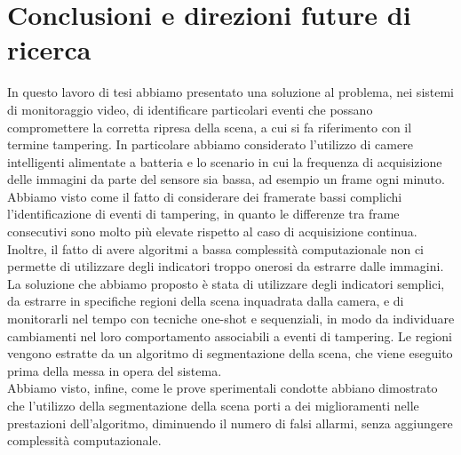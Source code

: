 \chapter{Conclusioni e direzioni future di ricerca}
\label{Conclusioni}
\thispagestyle{empty}

\noindent In questo lavoro di tesi abbiamo presentato una soluzione al problema, nei sistemi di monitoraggio video, di identificare particolari eventi che possano compromettere la corretta ripresa della scena, a cui si fa riferimento con il termine tampering.
In particolare abbiamo considerato l'utilizzo di camere intelligenti alimentate a batteria e lo scenario in cui la frequenza di acquisizione delle immagini da parte del sensore sia bassa, ad esempio un frame ogni minuto.\\
Abbiamo visto come il fatto di considerare dei framerate bassi complichi l'identificazione di eventi di tampering, in quanto le differenze tra frame consecutivi sono molto pi\`u elevate rispetto al caso di acquisizione continua. 
Inoltre, il fatto di avere algoritmi a bassa complessit\`a computazionale non ci permette di utilizzare degli indicatori troppo onerosi da estrarre dalle immagini.\\
La soluzione che abbiamo proposto \`e stata di utilizzare degli indicatori semplici, da estrarre in specifiche regioni della scena inquadrata dalla camera, e di monitorarli nel tempo con tecniche one-shot e sequenziali, in modo da individuare cambiamenti nel loro comportamento associabili a eventi di tampering.
Le regioni vengono estratte da un algoritmo di segmentazione della scena, che viene eseguito prima della messa in opera del sistema.\\
Abbiamo visto, infine, come le prove sperimentali condotte abbiano dimostrato che l'utilizzo della segmentazione della scena porti a dei miglioramenti nelle prestazioni dell'algoritmo, diminuendo il numero di falsi allarmi, senza aggiungere complessit\`a computazionale.\\